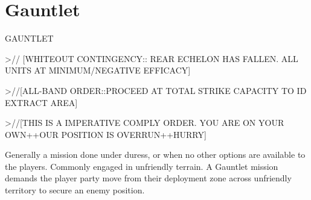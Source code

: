 \section{Gauntlet}


                                                             GAUNTLET

                                                             >// [WHITEOUT CONTINGENCY:: REAR
                                                             ECHELON HAS FALLEN. ALL UNITS AT
                                                             MINIMUM/NEGATIVE EFFICACY]

                                                             >//[ALL-BAND ORDER::PROCEED AT TOTAL
                                                             STRIKE CAPACITY TO ID EXTRACT AREA]

                                                             >//[THIS IS A IMPERATIVE COMPLY ORDER.
                                                             YOU ARE ON YOUR OWN++OUR POSITION
                                                             IS OVERRUN++HURRY]

                                                             Generally a mission done under duress, or
                                                            when no other options are available to the
                                                             players. Commonly engaged in unfriendly
                                                            terrain. A Gauntlet mission demands the
                                                             player party move from their deployment zone
                                                             across unfriendly territory to secure an enemy
                                                             position.

